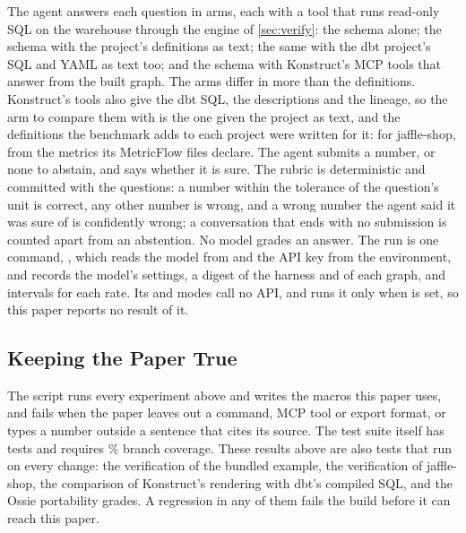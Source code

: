 The agent answers each question in \answerArms{} arms, each with a tool that runs read-only SQL on
the warehouse through the engine of \cref{sec:verify}: the schema alone; the schema with the
project's definitions as text; the same with the dbt project's SQL and YAML as text too; and the
schema with Konstruct's MCP tools that answer from the built graph. The arms differ in more than the
definitions. Konstruct's tools also give the dbt SQL, the descriptions and the lineage, so the arm
to compare them with is the one given the project as text, and the definitions the benchmark adds
to each project were written for it: for jaffle-shop, from the metrics its MetricFlow files
declare. The agent submits a number, or none to abstain, and says whether it is sure. The rubric is
deterministic and committed with the questions: a number within the tolerance of the question's
unit is correct, any other number is wrong, and a wrong number the agent said it was sure of is
confidently wrong; a conversation that ends with no submission is counted apart from an
abstention. No model grades an answer. The run is one command,
, which reads the model from
 and the API key from the environment, and records the model's
settings, a digest of the harness and of each graph, and intervals for each rate. Its 
and  modes call no API, and  runs it only when
 is set, so this paper reports no result of it.

\subsection{Keeping the Paper True}

The script  runs every experiment above and writes the macros this paper
uses, and
 fails when the paper leaves out a command, MCP tool or export format, or
types a number outside a sentence that cites its source. The test suite itself has
\testCount{} tests and requires \coverageFloor\% branch coverage. These results above are also
tests that run on every change: the verification of the bundled example, the verification of
jaffle-shop, the comparison of Konstruct's rendering with dbt's compiled SQL, and the Ossie
portability grades. A regression in any of them fails the build before it can reach this paper.
